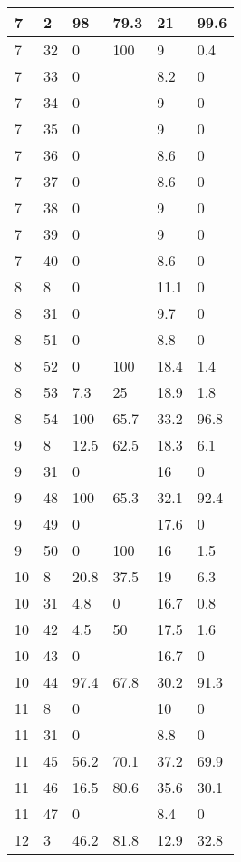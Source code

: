 \begin{longtable}[c]{ | p{2cm} | p{2cm} | p{2cm} | p{2cm} | p{3cm} | p{3cm} | }
	\hline
	7 & 2 & 98 & 79.3 & 21 & 99.6 \\
	\hline
	7 & 32 & 0 & 100 & 9 & 0.4 \\
	\hline
	7 & 33 & 0 &  & 8.2 & 0 \\
	\hline
	7 & 34 & 0 &  & 9 & 0 \\
	\hline
	7 & 35 & 0 &  & 9 & 0 \\
	\hline
	7 & 36 & 0 &  & 8.6 & 0 \\
	\hline
	7 & 37 & 0 &  & 8.6 & 0 \\
	\hline
	7 & 38 & 0 &  & 9 & 0 \\
	\hline
	7 & 39 & 0 &  & 9 & 0 \\
	\hline
	7 & 40 & 0 &  & 8.6 & 0 \\
	\hline
	\hline
	\hline
	8 & 8 & 0 &  & 11.1 & 0 \\
	\hline
	8 & 31 & 0 &  & 9.7 & 0 \\
	\hline
	8 & 51 & 0 &  & 8.8 & 0 \\
	\hline
	8 & 52 & 0 & 100 & 18.4 & 1.4 \\
	\hline
	8 & 53 & 7.3 & 25 & 18.9 & 1.8 \\
	\hline
	8 & 54 & 100 & 65.7 & 33.2 & 96.8 \\
	\hline
	\hline
	\hline
	9 & 8 & 12.5 & 62.5 & 18.3 & 6.1 \\
	\hline
	9 & 31 & 0 &  & 16 & 0 \\
	\hline
	9 & 48 & 100 & 65.3 & 32.1 & 92.4 \\
	\hline
	9 & 49 & 0 &  & 17.6 & 0 \\
	\hline
	9 & 50 & 0 & 100 & 16 & 1.5 \\
	\hline
	\hline
	\hline
	10 & 8 & 20.8 & 37.5 & 19 & 6.3 \\
	\hline
	10 & 31 & 4.8 & 0 & 16.7 & 0.8 \\
	\hline
	10 & 42 & 4.5 & 50 & 17.5 & 1.6 \\
	\hline
	10 & 43 & 0 &  & 16.7 & 0 \\
	\hline
	10 & 44 & 97.4 & 67.8 & 30.2 & 91.3 \\
	\hline
	\hline
	\hline
	11 & 8 & 0 &  & 10 & 0 \\
	\hline
	11 & 31 & 0 &  & 8.8 & 0 \\
	\hline
	11 & 45 & 56.2 & 70.1 & 37.2 & 69.9 \\
	\hline
	11 & 46 & 16.5 & 80.6 & 35.6 & 30.1 \\
	\hline
	11 & 47 & 0 &  & 8.4 & 0 \\
	\hline
	\hline
	\hline
	12 & 3 & 46.2 & 81.8 & 12.9 & 32.8 \\

\end{longtable}
